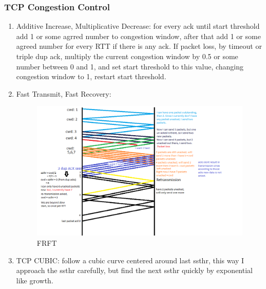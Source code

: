 \documentclass[11pt, a4paper]{article}
\begin{document}
\subsubsection{TCP Congestion Control}
\begin{enumerate}
    \item Additive Increase, Multiplicative Decrease: for every ack until start threshold add 1 or some agrred number to congestion window, after that add 1 or some agreed number for every RTT if there is any ack. If packet loss, by timeout or triple dup ack, multiply the current congestion window by 0.5 or some number between 0 and 1, and set start threshold to this value, changing congestion window to 1, restart start threshold.
    \item Fast Transmit, Fast Recovery:
    \begin{figure}[H]
        \centering
        \includegraphics[width = \textwidth]{Pictures/fast transmit, fast recovery.png}
        \caption{FRFT}
        \label{fig:FRFT}
    \end{figure}
    \item TCP CUBIC: follow a cubic curve centered around last ssthr, this way I approach the ssthr carefully, but find the next ssthr quickly by exponential like growth.
\end{enumerate}
\end{document}

